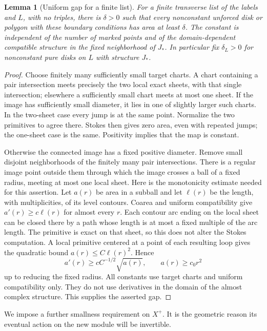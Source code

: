 \documentclass[11pt]{article}
\newtheorem{lemma}[theorem]{Lemma}
\theoremstyle{definition}
\theoremstyle{remark}
\numberwithin{equation}{section}
\begin{document}
\begin{lemma}[Uniform gap for a finite list]\label{local:gap}
For a finite transverse list of the labels and $L$, with no triples, there
is $\delta>0$ such that every nonconstant unforced disk or polygon with
these boundary conditions has area at least $\delta$.  The constant is
independent of the number of marked points and of the domain-dependent
compatible structure in the fixed neighborhood of $J_*$.  In particular
fix $\delta_L>0$ for nonconstant pure disks on $L$ with structure $J_*$.
\end{lemma}
\begin{proof}
Choose finitely many sufficiently small target charts.  A chart containing
a pair intersection meets precisely the two local exact sheets, with that
single intersection; elsewhere a sufficiently small chart meets at most
one sheet.  If the image has sufficiently small diameter, it lies in one
of slightly larger such charts.  In the two-sheet case every jump is at
the same point.  Normalize the two primitives to agree there.  Stokes
then gives zero area, even with repeated jumps; the one-sheet case is the
same.  Positivity implies that the map is constant.

Otherwise the connected image has a fixed positive diameter.  Remove
small disjoint neighborhoods of the finitely many pair intersections.
There is a regular image point outside them through which the image
crosses a ball of a fixed radius, meeting at most one local sheet.  Here
is the monotonicity estimate needed for this assertion.  Let $a(r)$ be
area in a subball and let $\ell(r)$ be the length, with multiplicities, of
its level contours.  Coarea and uniform compatibility give
$a'(r)\geq c\ell(r)$ for almost every $r$.  Each contour arc ending on the
local sheet can be closed there by a path whose length is at most a fixed
multiple of the arc length.  The primitive is exact on that sheet, so
this does not alter the Stokes computation.  A local primitive centered
at a point of each resulting loop gives the quadratic bound
$a(r)\leq C\ell(r)^2$.  Hence
\[
 a'(r)\geq cC^{-1/2}\sqrt{a(r)},\qquad a(r)\geq c_0r^2
\]
up to reducing the fixed radius.  All constants use target charts and
uniform compatibility only.  They do not use derivatives in the domain
of the almost complex structure.  This supplies the asserted gap.
\end{proof}

We impose a further smallness requirement on $X^+$.  It is the geometric
reason its eventual action on the new module will be invertible.
\end{document}
